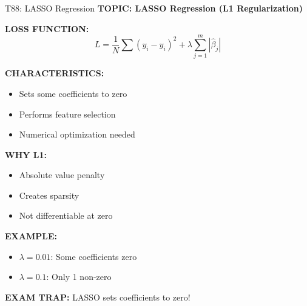 \documentclass[8pt]{beamer}
\begin{document}
	\begin{frame}{T88: LASSO Regression}
		\fontsize{6.5}{7.5}\selectfont
		\textbf{TOPIC: LASSO Regression (L1 Regularization)}
		
		\vspace{0.1cm}
		\textbf{LOSS FUNCTION:}
		\[
		L = \frac{1}{N}\sum(y_i - \hat{y}_i)^2 + \lambda \sum_{j=1}^m |\hat{\beta}_j|
		\]
		
		\vspace{0.1cm}
		\textbf{CHARACTERISTICS:}
		\begin{itemize}
			\item Sets some coefficients to zero
			\item Performs feature selection
			\item Numerical optimization needed
		\end{itemize}
		
		\vspace{0.1cm}
		\textbf{WHY L1:}
		\begin{itemize}
			\item Absolute value penalty
			\item Creates sparsity
			\item Not differentiable at zero
		\end{itemize}
		
		\vspace{0.1cm}
		\textbf{EXAMPLE:}
		\begin{itemize}
			\item $\lambda = 0.01$: Some coefficients zero
			\item $\lambda = 0.1$: Only 1 non-zero
		\end{itemize}
		
		\textcolor{myred}{\textbf{EXAM TRAP:}} LASSO \textcolor{myblue}{sets coefficients to zero}!
	\end{frame}
	
\end{document}
